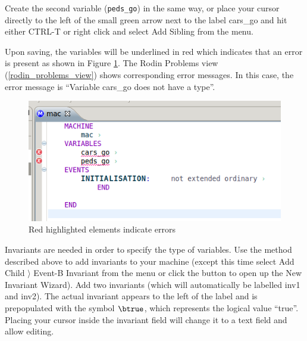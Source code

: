 Create the second variable (\texttt{peds\_go}) in the same way, or place your cursor directly to the left of the small green arrow next to the label \textsf{cars\_go} and hit either \textsf{CTRL-T} or right click and select \textsf{Add Sibling} from the menu.


Upon saving, the variables will be underlined in red which indicates that an error is present as shown in Figure \ref{fig_tut_03_error}.  The \textsf{Rodin Problems} view (\ref{rodin_problems_view}) shows corresponding error messages. In this case, the error message is ``Variable cars\_go does not have a type''.

\begin{figure}[!ht]
\begin{center}
	\includegraphics[]{img/tutorial/tut_03_error_neweditor.png}
	\caption{Red highlighted elements indicate errors}
	\label{fig_tut_03_error}
\end{center}
\end{figure}

Invariants are needed in order to specify the type of variables. Use the method described above to add invariants to your machine (except this time select \textsf{Add Child $\rangle$ Event-B Invariant} from the menu or click the  button to open up the New Invariant Wizard). Add two invariants (which will automatically be labelled \textsf{inv1} and \textsf{inv2}). The actual invariant appears to the left of the label and is prepopulated with the symbol $\btrue$, which represents the logical value ``true''. Placing your cursor inside the invariant field will change it to a text field and allow editing. 

